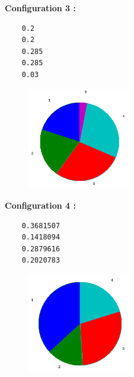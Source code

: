 \documentclass[a4paper,10pt]{report}
\begin{document}
\begin{figure}[H]
\begin{minipage}[c]{.40\linewidth}
\noindent \textbf{Configuration 3 :}
\begin{verbatim}
    0.2    
    0.2    
    0.285  
    0.285  
    0.03  
\end{verbatim}
\end{minipage} \hfill
\begin{minipage}[c]{.58\linewidth}
\begin{figure}[H]
   \includegraphics[width=4.5cm]{diag_config3.png}
   \end{figure}
\end{minipage}
\end{figure}

\begin{figure}[H]
\begin{minipage}[c]{.40\linewidth}
\noindent \textbf{Configuration 4 :}
\begin{verbatim}
    0.3681507  
    0.1418094  
    0.2879616  
    0.2020783 
\end{verbatim}
\end{minipage} \hfill
\begin{minipage}[c]{.58\linewidth}
\begin{figure}[H]
   \includegraphics[width=4.5cm]{diag_config4.png}
   \end{figure}
\end{minipage}
\end{figure}
\end{document}
